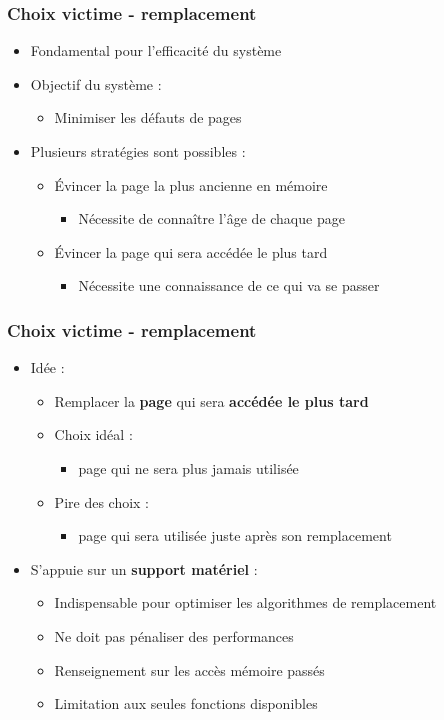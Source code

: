 \begin{frame}
\frametitle{Choix victime - remplacement}
\begin{itemize}
\item Fondamental pour l'efficacité du système
\item Objectif du système :
\begin{itemize}
\item Minimiser les défauts de pages
\end{itemize}
\item Plusieurs stratégies sont possibles :
\begin{itemize}
\item Évincer la page la plus ancienne en mémoire
\begin{itemize}
\item Nécessite de connaître l'âge de chaque page
\end{itemize}
\item Évincer la page qui sera accédée le plus tard
\begin{itemize}
\item Nécessite une connaissance de ce qui va se passer
\end{itemize}
\end{itemize}
\end{itemize}
\end{frame}


\begin{frame}
\frametitle{Choix victime - remplacement}
\begin{itemize}
\item Idée :
\begin{itemize}
\item Remplacer la \textbf{page} qui sera \textbf{accédée le plus tard}
\item Choix idéal :
\begin{itemize}
  \item page qui ne sera plus jamais utilisée
\end{itemize}
\item Pire des choix :
\begin{itemize}
  \item page qui sera utilisée juste après son remplacement
\end{itemize}
\end{itemize}
\item S'appuie sur un \textbf{support matériel} :
\begin{itemize}
\item Indispensable pour optimiser les algorithmes de remplacement
\item Ne doit pas pénaliser des performances
\item Renseignement sur les accès mémoire passés
\item Limitation aux seules fonctions disponibles
\end{itemize}
\end{itemize}
\end{frame}



